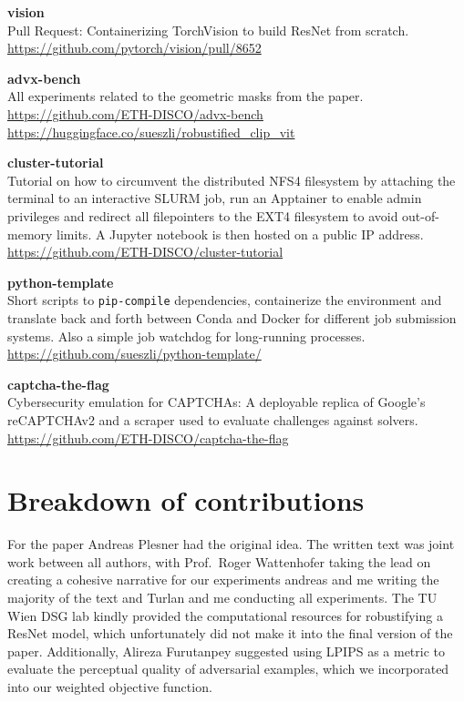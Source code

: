 \documentclass[a4paper, oneside]{discothesis}
\newcommand{\linebreaks}{\vspace*{0.5em}} %
\begin{document}
\linebreaks

\textbf{vision} \\
Pull Request: Containerizing TorchVision to build ResNet from scratch. \\
\url{https://github.com/pytorch/vision/pull/8652}

\linebreaks

\textbf{advx-bench} \\
All experiments related to the geometric masks from the paper. \\
\url{https://github.com/ETH-DISCO/advx-bench} \\
\url{https://huggingface.co/sueszli/robustified_clip_vit}

\linebreaks

\textbf{cluster-tutorial} \\
Tutorial on how to circumvent the distributed NFS4 filesystem by attaching the terminal to an interactive SLURM job, run an Apptainer to enable admin privileges and redirect all filepointers to the EXT4 filesystem to avoid out-of-memory limits. A Jupyter notebook is then hosted on a public IP address. \\
\url{https://github.com/ETH-DISCO/cluster-tutorial}

\linebreaks

\textbf{python-template} \\
Short scripts to \texttt{pip-compile} dependencies, containerize the environment and translate back and forth between Conda and Docker for different job submission systems. Also a simple job watchdog for long-running processes. \\ 
\url{https://github.com/sueszli/python-template/}

\linebreaks

\textbf{captcha-the-flag} \\
Cybersecurity emulation for CAPTCHAs: A deployable replica of Google's reCAPTCHAv2 and a scraper used to evaluate challenges against solvers. \\
\url{https://github.com/ETH-DISCO/captcha-the-flag}

\section*{Breakdown of contributions}

For the paper Andreas Plesner had the original idea. The written text was joint work between all authors, with Prof.\ Roger Wattenhofer taking the lead on creating a cohesive narrative for our experiments andreas and me writing the majority of the text and Turlan and me conducting all experiments. The TU Wien DSG lab kindly provided the computational resources for robustifying a ResNet model, which unfortunately did not make it into the final version of the paper. Additionally, Alireza Furutanpey suggested using LPIPS as a metric to evaluate the perceptual quality of adversarial examples, which we incorporated into our weighted objective function.
\end{document}
